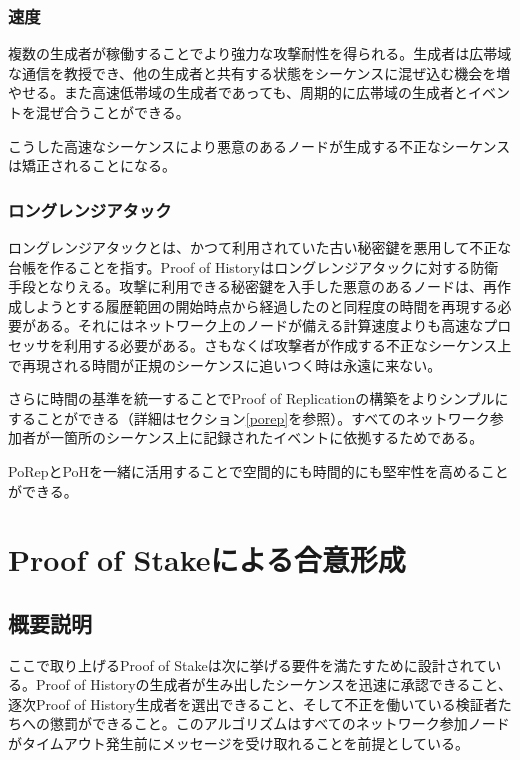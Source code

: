 \documentclass[12pt]{ltjsarticle}
\begin{document}
\subsubsection{速度}
複数の生成者が稼働することでより強力な攻撃耐性を得られる。生成者は広帯域な通信を教授でき、他の生成者と共有する状態をシーケンスに混ぜ込む機会を増やせる。また高速低帯域の生成者であっても、周期的に広帯域の生成者とイベントを混ぜ合うことができる。

こうした高速なシーケンスにより悪意のあるノードが生成する不正なシーケンスは矯正されることになる。

\subsubsection{ロングレンジアタック}

ロングレンジアタックとは、かつて利用されていた古い秘密鍵を悪用して不正な台帳を作ることを指す\cite{casper}。Proof of Historyはロングレンジアタックに対する防衛手段となりえる。攻撃に利用できる秘密鍵を入手した悪意のあるノードは、再作成しようとする履歴範囲の開始時点から経過したのと同程度の時間を再現する必要がある。それにはネットワーク上のノードが備える計算速度よりも高速なプロセッサを利用する必要がある。さもなくば攻撃者が作成する不正なシーケンス上で再現される時間が正規のシーケンスに追いつく時は永遠に来ない。

さらに時間の基準を統一することでProof of Replicationの構築をよりシンプルにすることができる（詳細はセクション\ref{porep}を参照）。すべてのネットワーク参加者が一箇所のシーケンス上に記録されたイベントに依拠するためである。

PoRepとPoHを一緒に活用することで空間的にも時間的にも堅牢性を高めることができる。

\section{Proof of Stakeによる合意形成}\label{proof_of_stake}
\subsection{概要説明}
ここで取り上げるProof of Stakeは次に挙げる要件を満たすために設計されている。Proof of Historyの生成者が生み出したシーケンスを迅速に承認できること、逐次Proof of History生成者を選出できること、そして不正を働いている検証者たちへの懲罰ができること。このアルゴリズムはすべてのネットワーク参加ノードがタイムアウト発生前にメッセージを受け取れることを前提としている。
\end{document}
